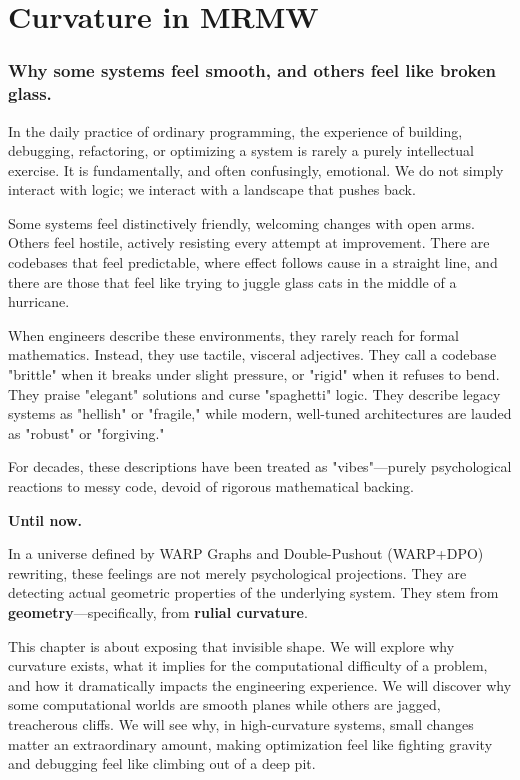 \chapter{Curvature in MRMW}
\label{chapter-9-curvature}

\subsection{\texorpdfstring{\textbf{Why some systems feel smooth, and others feel like broken glass.}}{Why some systems feel smooth, and others feel like broken glass.}}

In the daily practice of ordinary programming, the experience of building, debugging, refactoring, or optimizing a system is rarely a purely intellectual exercise. It is fundamentally, and often confusingly, emotional. We do not simply interact with logic; we interact with a landscape that pushes back.

Some systems feel distinctively friendly, welcoming changes with open arms. Others feel hostile, actively resisting every attempt at improvement. There are codebases that feel predictable, where effect follows cause in a straight line, and there are those that feel like trying to juggle glass cats in the middle of a hurricane.

When engineers describe these environments, they rarely reach for formal mathematics. Instead, they use tactile, visceral adjectives. They call a codebase "brittle" when it breaks under slight pressure, or "rigid" when it refuses to bend. They praise "elegant" solutions and curse "spaghetti" logic. They describe legacy systems as "hellish" or "fragile," while modern, well-tuned architectures are lauded as "robust" or "forgiving."

For decades, these descriptions have been treated as "vibes"---purely psychological reactions to messy code, devoid of rigorous mathematical backing.

\textbf{Until now.}

In a universe defined by WARP Graphs and Double-Pushout (WARP+DPO) rewriting, these feelings are not merely psychological projections. They are detecting actual geometric properties of the underlying system. They stem from \textbf{geometry}---specifically, from \textbf{rulial curvature}.

This chapter is about exposing that invisible shape. We will explore why curvature exists, what it implies for the computational difficulty of a problem, and how it dramatically impacts the engineering experience. We will discover why some computational worlds are smooth planes while others are jagged, treacherous cliffs. We will see why, in high-curvature systems, small changes matter an extraordinary amount, making optimization feel like fighting gravity and debugging feel like climbing out of a deep pit.

